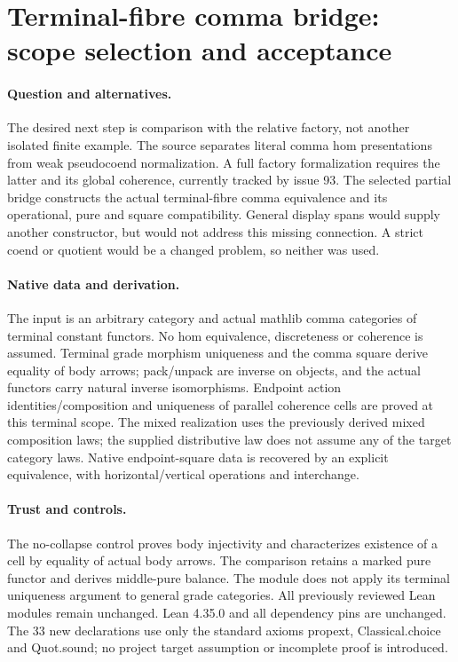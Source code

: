 \documentclass{article}
\begin{document}
\section*{Terminal-fibre comma bridge: scope selection and acceptance}
\paragraph{Question and alternatives.} The desired next step is comparison with the relative factory, not another isolated finite example. The source separates literal comma hom presentations from weak pseudocoend normalization. A full factory formalization requires the latter and its global coherence, currently tracked by issue 93. The selected partial bridge constructs the actual terminal-fibre comma equivalence and its operational, pure and square compatibility. General display spans would supply another constructor, but would not address this missing connection. A strict coend or quotient would be a changed problem, so neither was used.
\paragraph{Native data and derivation.} The input is an arbitrary category and actual mathlib comma categories of terminal constant functors. No hom equivalence, discreteness or coherence is assumed. Terminal grade morphism uniqueness and the comma square derive equality of body arrows; pack/unpack are inverse on objects, and the actual functors carry natural inverse isomorphisms. Endpoint action identities/composition and uniqueness of parallel coherence cells are proved at this terminal scope. The mixed realization uses the previously derived mixed composition laws; the supplied distributive law does not assume any of the target category laws. Native endpoint-square data is recovered by an explicit equivalence, with horizontal/vertical operations and interchange.
\paragraph{Trust and controls.} The no-collapse control proves body injectivity and characterizes existence of a cell by equality of actual body arrows. The comparison retains a marked pure functor and derives middle-pure balance. The module does not apply its terminal uniqueness argument to general grade categories. All previously reviewed Lean modules remain unchanged. Lean 4.35.0 and all dependency pins are unchanged. The 33 new declarations use only the standard axioms propext, Classical.choice and Quot.sound; no project target assumption or incomplete proof is introduced.
\end{document}
